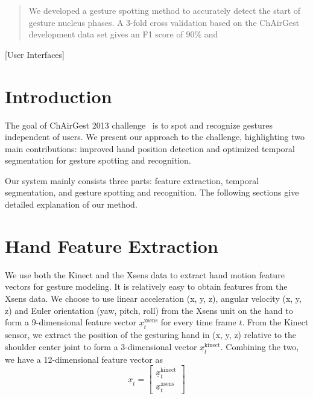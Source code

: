 \documentclass{acm_proc_article-sp}
\begin{document}
\maketitle
\begin{abstract}
We developed a gesture spotting method to accurately detect the start of gesture nucleus phases.
A 3-fold cross validation based on the ChAirGest development data set gives an F1 score of 90\%
and 
\end{abstract}

[User Interfaces]


\section{Introduction}
The goal of ChAirGest 2013 challenge~\cite{Ruffieux2013} is to spot and recognize gestures independent of
users. We present our approach to the challenge, highlighting two main contributions: 
improved hand position detection and optimized temporal segmentation for gesture spotting
and recognition.

Our system mainly consists three parts: feature extraction, temporal segmentation, and gesture
spotting and recognition. 
The following sections give detailed explanation of our method.  

\section{Hand Feature Extraction}
We use both the Kinect and the Xsens data to extract hand motion feature vectors for gesture modeling. 
It is relatively easy to obtain features from the Xsens data. We choose to use linear
acceleration (x, y, z), angular velocity (x, y, z) and Euler orientation (yaw, pitch, roll)
from the Xsens unit on the hand to form a 9-dimensional feature vector $\underline{x}_t^{\text{xsens}}$
for every time frame $t$.
From the Kinect sensor, we extract the position of the gesturing hand in (x, y, z) relative to
the shoulder center joint to
form a 3-dimensional vector $\underline{x}_t^{\text{kinect}}$. Combining the two, we
have a 12-dimensional feature vector as
\begin{displaymath}
\underline{x}_t = \left[ \begin{array}{c}
\underline{x}^\text{kinect}_t\\
\underline{x}^\text{xsens}_t
\end{array}\right]
\end{displaymath} 
\end{document}
